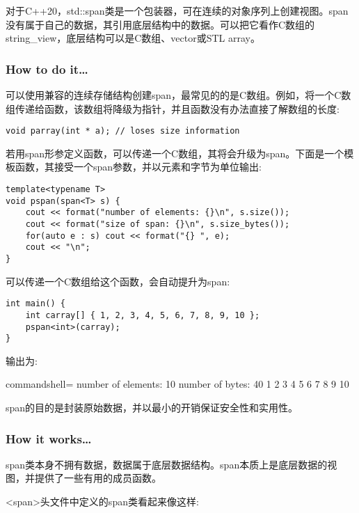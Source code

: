 
对于C++20，std::span类是一个包装器，可在连续的对象序列上创建视图。span没有属于自己的数据，其引用底层结构中的数据。可以把它看作C数组的string\_view，底层结构可以是C数组、vector或STL array。

\subsubsection{How to do it…}

可以使用兼容的连续存储结构创建span，最常见的的是C数组。例如，将一个C数组传递给函数，该数组将降级为指针，并且函数没有办法直接了解数组的长度:

\begin{lstlisting}[style=styleCXX]
void parray(int * a); // loses size information
\end{lstlisting}

若用span形参定义函数，可以传递一个C数组，其将会升级为span。下面是一个模板函数，其接受一个span参数，并以元素和字节为单位输出:

\begin{lstlisting}[style=styleCXX]
template<typename T>
void pspan(span<T> s) {
	cout << format("number of elements: {}\n", s.size());
	cout << format("size of span: {}\n", s.size_bytes());
	for(auto e : s) cout << format("{} ", e);
	cout << "\n";
}
\end{lstlisting}

可以传递一个C数组给这个函数，会自动提升为span:

\begin{lstlisting}[style=styleCXX]
int main() {
	int carray[] { 1, 2, 3, 4, 5, 6, 7, 8, 9, 10 };
	pspan<int>(carray);
}
\end{lstlisting}

输出为:

\begin{tcblisting}{commandshell={}}
number of elements: 10
number of bytes: 40
1 2 3 4 5 6 7 8 9 10
\end{tcblisting}

span的目的是封装原始数据，并以最小的开销保证安全性和实用性。

\subsubsection{How it works…}

span类本身不拥有数据，数据属于底层数据结构。span本质上是底层数据的视图，并提供了一些有用的成员函数。

<span>头文件中定义的span类看起来像这样:

